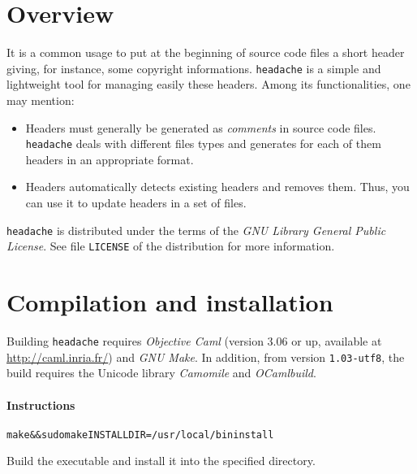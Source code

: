 \documentclass{article}
\title{\headache{}}
\author{Vincent Simonet}
\date{November, 2002}
\newcommand{\mytt}[1]{\texttt{#1}}
\newcommand{\headache}{\mytt{headache}}
\begin{document}
\maketitle


\section{Overview}

It is a common usage to put at the beginning of source code files a
short header giving, for instance, some copyright informations.
\headache{} is a simple and lightweight tool for managing easily these
headers.  Among its functionalities, one may mention:
\begin{itemize}
\item Headers must generally be generated as \emph{comments} in source
  code files.  \headache{} deals with different files types and generates
  for each of them headers in an appropriate format.
\item Headers automatically detects existing headers and removes them.
  Thus, you can use it to update headers in a set of files.
\end{itemize}

\headache{} is distributed under the terms of the \emph{GNU Library General
  Public License}.  See file \mytt{LICENSE} of the distribution for
more information.


\section{Compilation and installation}

Building \headache{} requires \emph{Objective Caml} (version 3.06 or up,
available at \url{http://caml.inria.fr/}) and \emph{GNU Make}.
In addition, from version \texttt{1.03-utf8}, the build requires the Unicode library \emph{Camomile} and \emph{OCamlbuild}.

\paragraph{Instructions}

\begin{alltt}
  make && sudo make INSTALLDIR=/usr/local/bin install
\end{alltt}
Build the executable and install it into the specified directory.
\end{document}
